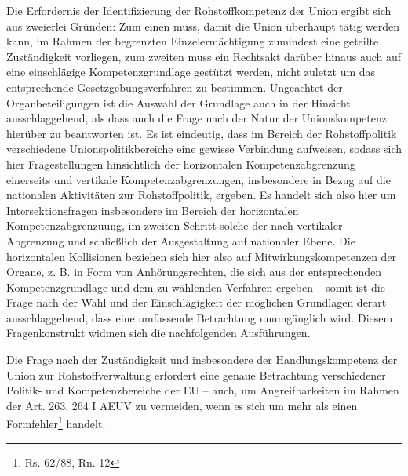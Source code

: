 \documentclass[12pt,a4paper,oneside]{book} %
\begin{document}
	Die Erfordernis der Identifizierung der Rohstoffkompetenz der Union ergibt sich aus zweierlei Gründen: Zum einen muss, damit die Union überhaupt tätig werden kann, im Rahmen der begrenzten Einzelermächtigung zumindest eine geteilte Zuständigkeit vorliegen, zum zweiten muss ein Rechtsakt darüber hinaus auch auf eine einschlägige Kompetenzgrundlage gestützt werden, nicht zuletzt um das entsprechende Gesetzgebungsverfahren zu bestimmen. Ungeachtet der Organbeteiligungen ist die Auswahl der Grundlage auch in der Hinsicht ausschlaggebend, als dass auch die Frage nach der Natur der Unionskompetenz hierüber zu beantworten ist. Es ist eindeutig, dass im Bereich der Rohstoffpolitik verschiedene Unionspolitikbereiche eine gewisse Verbindung aufweisen, sodass sich hier Fragestellungen hinsichtlich der horizontalen Kompetenzabgrenzung einerseits und vertikale Kompetenzabgrenzungen, insbesondere in Bezug auf die nationalen Aktivitäten zur Rohstoffpolitik, ergeben. Es handelt sich also hier um Intersektionsfragen insbesondere im Bereich der horizontalen Kompetenzabgrenzuung, im zweiten Schritt solche der nach vertikaler Abgrenzung und schließlich der Ausgestaltung auf nationaler Ebene. Die horizontalen Kollisionen beziehen sich hier also auf Mitwirkungskompetenzen der Organe, z. B. in Form von Anhörungsrechten, die sich aus der entsprechenden Kompetenzgrundlage und dem zu wählenden Verfahren ergeben -- somit ist die Frage nach der Wahl und der Einschlägigkeit der möglichen Grundlagen derart ausschlaggebend, dass eine umfassende Betrachtung unumgänglich wird. Diesem Fragenkonstrukt widmen sich die nachfolgenden Ausführungen.
	
	Die Frage nach der Zuständigkeit und insbesondere der Handlungskompetenz der Union zur Rohstoffverwaltung erfordert eine genaue Betrachtung verschiedener Politik- und Kompetenzbereiche der EU -- auch, um Angreifbarkeiten im Rahmen der Art. 263, 264 I AEUV zu vermeiden, wenn es sich um mehr als einen \glqq Formfehler\grqq\footnote{Rs. 62/88, Rn. 12} handelt.
	
\end{document}
